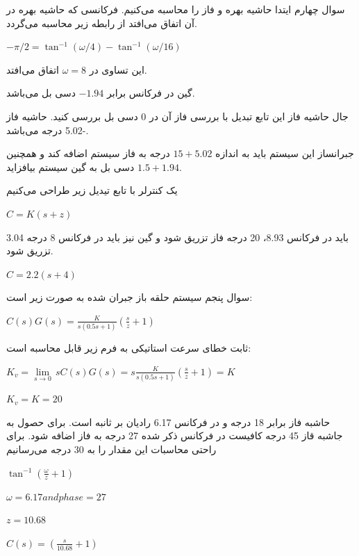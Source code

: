 \documentclass{article}
\begin{document}
    
    \begin{problem}{سوال چهارم}
        ایتدا حاشیه بهره و فاز را محاسبه می‌کنیم.
        فرکانسی که حاشیه بهره در آن اتفاق می‌افتد از رابطه زیر محاسبه می‌گردد.
        
        $-\pi/2 = \tan^{-1}(\omega/4) - \tan^{-1}(\omega/16)$
        
        این تساوی در 
        $\omega = 8$
        اتفاق می‌افتد.
        
        گین در فرکانس برابر
         $-1.94$
          دسی بل می‌باشد.
        
        جال حاشیه فاز این تابع تبدیل با بررسی فاز آن در 0 دسی بل بررسی کنید. حاشیه فاز -5.02 درجه می‌باشد.
        
        جبرانساز این سیستم باید به اندازه
        $15 + 5.02$
        درجه به فاز سیستم اضافه کند و همچنین
        $1.5+1.94$
        دسی بل به گین سیستم بیافزاید. 
        
        یک کنترلر  با تابع تیدیل زیر طراحی می‌کنیم
        
        $C = K(s+z)$
        
        باید در فرکانس 8.93، 20 درجه فاز تزریق شود و گین نیز باید در فرکانس 8 درجه 3.04 تزریق شود.
        
        $C = 2.2(s+4)$

    \end{problem}

    
    \begin{problem}{سوال پنجم}
    	سیستم حلقه باز جبران شده به صورت زیر است:
    	
    	\raggedleft
    	$C(s)G(s) = \frac{K}{s(0.5s+1)} (\frac{s}{z} + 1)$
    	
    	\raggedright
    	ثابت خطای سرعت استاتیکی به فرم زیر قابل محاسبه است:
    	
    	\raggedleft
    	${{K}_{v}}=\underset{s\to 0}{\mathop{\lim }}\,sC(s)G(s)=s\frac{K}{s(0.5s+1)}(\frac{s}{z}+1)=K$
    	
    	$K_v = K = 20$
    	
    	\raggedright
    	حاشبه فاز 
    	برابر 18 درجه و در فرکانس 6.17 رادیان بر ثانبه است. برای حصول به جاشبه قاز 45 درجه کافیست در فرکانس ذکر شده 27 درجه به فاز اضافه شود. برای راحتی محاسبات این مقدار را به 30 درجه می‌رسانیم
    	
    	\raggedleft
    	$\tan^{-1}(\frac{\omega}{z} + 1)$
    	
    	$\omega = 6.17 and phase = 27$
    	
    	$z = 10.68$
    	
    	$C(s) = (\frac{s}{10.68} + 1)$
    	
    	
    
    \end{problem}
\raggedleft    
\end{document}
